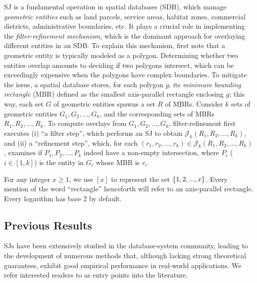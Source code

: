 \documentclass[sigconf]{acmart}
\def\vgap{\vspace{0mm}}
\def\extraspacing{\vspace{1mm} \noindent}
\def\J{\mathcal{J}}
\begin{document}
\vgap

SJ is a fundamental operation in spatial databases (SDB), which manage {\em geometric entities} such as land parcels, service areas, habitat zones, commercial districts, administrative boundaries, etc. It plays a crucial role in implementing the {\em filter-refinement mechanism}, which is the dominant approach for overlaying different entities in an SDB. To explain this mechanism, first note that a geometric entity is typically modeled as a polygon. Determining whether two entities overlap amounts to deciding if two polygons intersect, which can be exceedingly expensive when the polygons have complex boundaries. To mitigate the issue, a spatial database stores, for each polygon $g$, its {\em minimum bounding rectangle} (MBR) defined as the smallest axis-parallel rectangle enclosing $g$; this way, each set $G$ of geometric entities spawns a set $R$ of MBRs. Consider $k$ sets of geometric entities $G_1, G_2, ..., G_k$, and the corresponding sets of MBRs $R_1, R_2, ..., R_k$. To compute overlays from $G_1, G_2, ..., G_k$, filter-refinement first executes (i) ``a filter step'', which performs an SJ to obtain $\J_k(R_1, R_2, ..., R_k)$, and (ii) a ``refinement step'', which, for each $(r_1, r_2, ..., r_k) \in \J_k(R_1, R_2, ..., R_k)$, examines if $P_1, P_2, ..., P_k$ indeed have a non-empty intersection, where $P_i$ ($i \in [1, k]$) is the entity in $G_i$ whose MBR is $r_i$.


\extraspacing {\bf Math Conventions.} For any integer $x \ge 1$, we use $[x]$ to represent the set $\{1, 2, ..., x\}$. Every mention of the word ``rectangle'' henceforth will refer to an axis-parallel rectangle. Every logarithm has base 2 by default.

\subsection{Previous Results} \label{sec:intro:prev}

SJs have been extensively studied in the database-system community, leading to the development of numerous methods that, although lacking strong theoretical guarantees, exhibit good empirical performance in real-world applications. We refer interested readers to \cite{apr+00,bks93,gcn+13,js07,ks97,lr94,lr96,mp98,mp01,mp03,pd96,pmt99} as entry points into the literature.

\vgap
\end{document}
